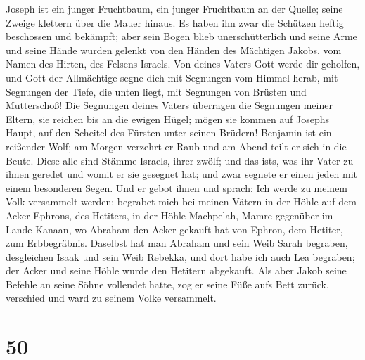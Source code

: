 Joseph ist ein junger Fruchtbaum, ein junger Fruchtbaum an der Quelle;
seine Zweige klettern über die Mauer hinaus.  Es haben
ihn zwar die Schützen heftig beschossen und bekämpft; 
aber sein Bogen blieb unerschütterlich und seine Arme und seine Hände
wurden gelenkt von den Händen des Mächtigen Jakobs, vom Namen des
Hirten, des Felsens Israels.  Von deines Vaters Gott
werde dir geholfen, und Gott der Allmächtige segne dich mit Segnungen
vom Himmel herab, mit Segnungen der Tiefe, die unten liegt, mit
Segnungen von Brüsten und Mutterschoß!  Die Segnungen
deines Vaters überragen die Segnungen meiner Eltern, sie reichen bis an
die ewigen Hügel; mögen sie kommen auf Josephs Haupt, auf den Scheitel
des Fürsten unter seinen Brüdern!  Benjamin ist ein
reißender Wolf; am Morgen verzehrt er Raub und am Abend teilt er sich in
die Beute.  Diese alle sind Stämme Israels, ihrer zwölf;
und das ist\textquotesingle s, was ihr Vater zu ihnen geredet und womit
er sie gesegnet hat; und zwar segnete er einen jeden mit einem
besonderen Segen.  Und er gebot ihnen und sprach: Ich
werde zu meinem Volk versammelt werden; begrabet mich bei meinen Vätern
in der Höhle auf dem Acker Ephrons, des Hetiters,  in der
Höhle Machpelah, Mamre gegenüber im Lande Kanaan, wo Abraham den Acker
gekauft hat von Ephron, dem Hetiter, zum Erbbegräbnis. 
Daselbst hat man Abraham und sein Weib Sarah begraben, desgleichen Isaak
und sein Weib Rebekka, und dort habe ich auch Lea begraben;
 der Acker und seine Höhle wurde den Hetitern abgekauft.
 Als aber Jakob seine Befehle an seine Söhne vollendet
hatte, zog er seine Füße aufs Bett zurück, verschied und ward zu seinem
Volke versammelt.

\hypertarget{section-49}{%
\section{50}\label{section-49}}

